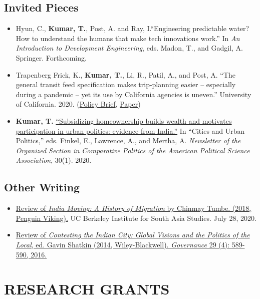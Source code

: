 \documentclass[10pt]{article}
\begin{document}
\subsection*{Invited Pieces}
\begin{itemize}
	\item[]Hyun, C., \textbf{Kumar, T.}, Post, A. and Ray, I.``Engineering predictable water? How to understand the humans that make tech innovations work.'' In \textit{An Introduction to Development Engineering}, eds. Madon, T., and Gadgil, A. Springer. Forthcoming.
\item[]Trapenberg Frick, K., \textbf{Kumar, T.}, Li, R., Patil, A., and Post, A. ``The general transit feed specification makes trip-planning easier -- especially during a pandemic -- yet its use by California agencies is uneven.'' University of California. 2020. (\href{https://escholarship.org/uc/item/9j94q60f}{Policy Brief}, \href{https://escholarship.org/uc/item/1f29b7dk}{Paper}) 
\item[]\textbf{Kumar, T.} \href{https://www.comparativepoliticsnewsletter.org/wp-content/uploads/2020/05/Spring-Newsletter-2020.pdf}{``Subsidizing homeownership builds wealth and motivates participation in urban politics: evidence from India.''}  In ``Cities and Urban Politics,'' eds. Finkel, E.,  Lawrence, A.,  and Mertha, A.  \textit{Newsletter of the Organized Section in Comparative Politics of the American Political Science Association}, 30(1). 2020.
	\end{itemize}
	
\subsection*{Other Writing}	
\begin{itemize}
\item[]\href{https://southasia.berkeley.edu/sites/default/files/shared/India_Center/India_Moving.pdf}{Review of \textit{India Moving: A History of Migration} by Chinmay Tumbe. (2018, Penguin Viking).}  UC Berkeley Institute for South Asia Studies. July 28, 2020.
\item[] \href{http://onlinelibrary.wiley.com/doi/10.1111/gove.12241/abstract}{Review of \textit{Contesting the Indian City: Global Visions and the Politics of the Local}, ed. Gavin Shatkin (2014, Wiley-Blackwell). \textit{Governance} 29 (4): 589-590, 2016.} \

\end{itemize}
\vspace{3mm}
\section*{RESEARCH GRANTS}
\end{document}
